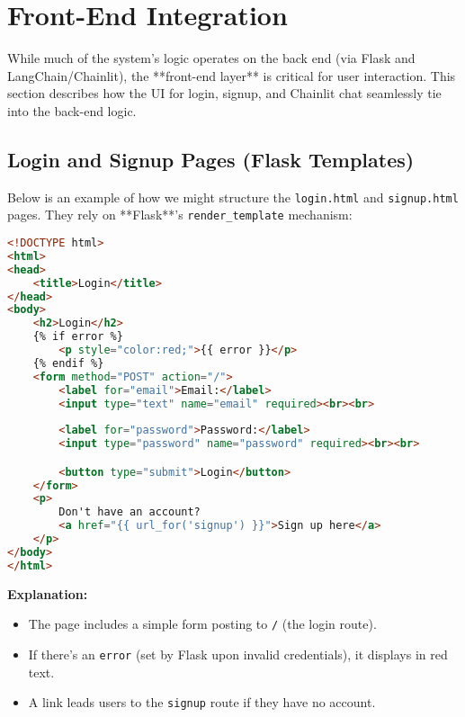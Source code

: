 \section{Front-End Integration}
\label{sec:frontend}

While much of the system’s logic operates on the back end (via Flask and LangChain/Chainlit), the **front-end layer** is critical for user interaction. This section describes how the UI for login, signup, and Chainlit chat seamlessly tie into the back-end logic.

\subsection{Login and Signup Pages (Flask Templates)}

Below is an example of how we might structure the \texttt{login.html} and \texttt{signup.html} pages. They rely on **Flask**’s \texttt{render\_template} mechanism:

\begin{lstlisting}[language=HTML, caption={login.html (Flask Template)}, basicstyle=\small\ttfamily]
<!DOCTYPE html>
<html>
<head>
    <title>Login</title>
</head>
<body>
    <h2>Login</h2>
    {% if error %}
        <p style="color:red;">{{ error }}</p>
    {% endif %}
    <form method="POST" action="/">
        <label for="email">Email:</label>
        <input type="text" name="email" required><br><br>
        
        <label for="password">Password:</label>
        <input type="password" name="password" required><br><br>

        <button type="submit">Login</button>
    </form>
    <p>
        Don't have an account? 
        <a href="{{ url_for('signup') }}">Sign up here</a>
    </p>
</body>
</html>
\end{lstlisting}

\noindent\textbf{Explanation:}
\begin{itemize}
    \item The page includes a simple form posting to \texttt{/} (the login route).
    \item If there’s an \texttt{error} (set by Flask upon invalid credentials), it displays in red text.
    \item A link leads users to the \texttt{signup} route if they have no account.
\end{itemize}

